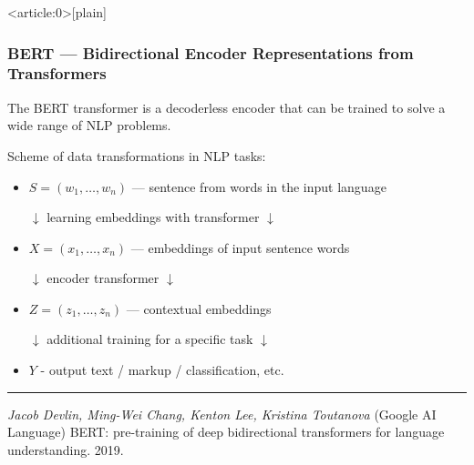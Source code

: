 \documentclass[fullscreen=true, bookmarks=true, hyperref={pdfencoding=unicode}]{beamer}
\begin{document}
{ %
    \begin{frame}<article:0>[plain]
     \end{frame}
}


\begin{frame}
  \frametitle{BERT — Bidirectional Encoder Representations from Transformers}

  The BERT transformer is a decoderless encoder that can be trained to solve a wide range of NLP problems.

  Scheme of data transformations in NLP tasks:

  \begin{itemize}
    \item $S = (w_1, \dots, w_n)$ — sentence from words in the input language

          $\downarrow$ learning embeddings with transformer $\downarrow$
    \item $X = (x_1, \dots, x_n)$ — embeddings of input sentence words

          $\downarrow$ encoder transformer $\downarrow$
    \item $Z = (z_1, \dots, z_n)$ — contextual embeddings

          $\downarrow$ additional training for a specific task $\downarrow$
    \item $Y$ - output text / markup / classification, etc.
  \end{itemize}

  \noindent\rule{8cm}{0.4pt}

  {\footnotesize
  {\it Jacob Devlin, Ming-Wei Chang, Kenton Lee, Kristina Toutanova} (Google AI Language)
  BERT: pre-training of deep bidirectional transformers for language understanding. 2019.}
\end{frame}
\end{document}
